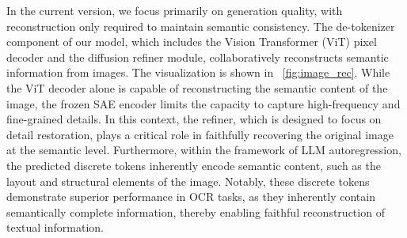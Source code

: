 In the current version, we focus primarily on generation quality, with reconstruction only required to maintain semantic consistency. The de-tokenizer component of our model, which includes the Vision Transformer (ViT) pixel decoder and the diffusion refiner module, collaboratively reconstructs semantic information from images. The visualization is shown in ~\ref{fig:image_rec}. While the ViT decoder alone is capable of reconstructing the semantic content of the image, the frozen SAE encoder limits the capacity to capture high-frequency and fine-grained details. In this context, the refiner, which is designed to focus on detail restoration, plays a critical role in faithfully recovering the original image at the semantic level. Furthermore, within the framework of LLM autoregression, the predicted discrete tokens inherently encode semantic content, such as the layout and structural elements of the image. Notably, these discrete tokens demonstrate superior performance in OCR tasks, as they inherently contain semantically complete information, thereby enabling faithful reconstruction of textual information.






        
        
